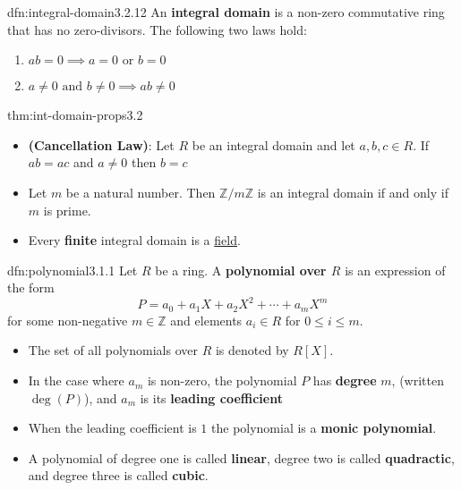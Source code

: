 \documentclass[landscape, 8pt]{extarticle}
\begin{document}
\begin{multicols}{3}
\begin{dfn}{dfn:integral-domain}{3.2.12}
    An \textbf{integral domain} is a non-zero commutative ring that has no zero-divisors. The following two laws hold:
    \begin{enumerate}
        \setlength\itemsep{0em}
        \item $ab = 0 \implies a = 0 \text{ or } b = 0$
        \item $a \ne 0 \text{ and } b \ne 0 \implies ab \ne 0$
    \end{enumerate}
\end{dfn}


\begin{thm}{thm:int-domain-props}{3.2}
    \begin{itemize}
        \setlength\itemsep{0em}
        \item[\textbf{3.2.15}] \textbf{(Cancellation Law)}: Let $R$ be an integral domain and let $a,b,c\in R$. If $ab = ac$ and $a\ne 0$ then $b = c$
        \item[\textbf{3.2.16}] Let $m$ be a natural number. Then $\mathbb{Z} / m\mathbb{Z}$ is an integral domain if and only if $m$ is prime.
        \item[\textbf{3.2.17}] Every \textbf{finite} integral domain is a \hyperref[dfn:fields-and-rings]{field}.
    \end{itemize}
    
    
\end{thm}

\newpage
\begin{dfn}[Polynomial]{dfn:polynomial}{3.1.1}
    Let $R$ be a ring. A \textbf{polynomial over $R$} is an expression of the form
    \[P = a_{0} + a_{1}X + a_{2}X^{2} + \cdots + a_{m}X^{m}\]
    for some non-negative $m\in \mathbb{Z}$ and elements $a_{i}\in R$ for $0 \le i \le m$. 

    \vspace{-5pt}
    \begin{itemize}[leftmargin=*]
        \setlength\itemsep{0em}
        \item The set of all polynomials over $R$ is denoted by $R[X]$.
        \item In the case where $a_{m}$ is non-zero, the polynomial $P$ has \textbf{degree} $m$, (written $\deg(P)$), and $a_{m}$ is its \textbf{leading coefficient}
        \item When the leading coefficient is $1$ the polynomial is a \textbf{monic polynomial}.
        \item A polynomial of degree one is called \textbf{linear}, degree two is called \textbf{quadractic}, and degree three is called \textbf{cubic}.
    \end{itemize}


\end{dfn}
\end{multicols}
\end{document}
